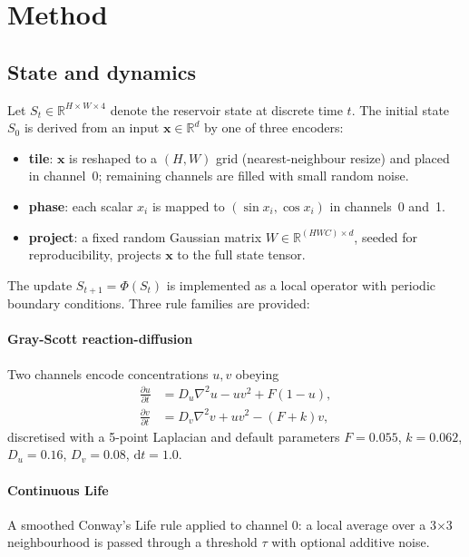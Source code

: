 \documentclass[11pt,a4paper]{article}
\begin{document}
\section{Method}

\subsection{State and dynamics}

Let $S_t \in \mathbb{R}^{H \times W \times 4}$ denote the reservoir state at
discrete time $t$. The initial state $S_0$ is derived from an input
$\mathbf{x} \in \mathbb{R}^d$ by one of three encoders:

\begin{itemize}
    \item \textbf{tile}: $\mathbf{x}$ is reshaped to a $(H, W)$ grid
    (nearest-neighbour resize) and placed in channel~0; remaining channels are
    filled with small random noise.
    \item \textbf{phase}: each scalar $x_i$ is mapped to $(\sin x_i, \cos x_i)$
    in channels~0 and~1.
    \item \textbf{project}: a fixed random Gaussian matrix
    $W \in \mathbb{R}^{(HWC) \times d}$, seeded for reproducibility, projects
    $\mathbf{x}$ to the full state tensor.
\end{itemize}

The update $S_{t+1} = \Phi(S_t)$ is implemented as a local operator with
periodic boundary conditions. Three rule families are provided:

\paragraph{Gray-Scott reaction-diffusion} Two channels encode concentrations
$u, v$ obeying
\begin{align}
    \frac{\partial u}{\partial t} &= D_u \nabla^2 u - u v^2 + F(1 - u), \\
    \frac{\partial v}{\partial t} &= D_v \nabla^2 v + u v^2 - (F + k) v,
\end{align}
discretised with a 5-point Laplacian and default parameters
$F=0.055$, $k=0.062$, $D_u=0.16$, $D_v=0.08$, $\mathrm{d}t=1.0$.

\paragraph{Continuous Life} A smoothed Conway's Life rule applied to channel
0: a local average over a 3$\times$3 neighbourhood is passed through a
threshold $\tau$ with optional additive noise.
\end{document}
